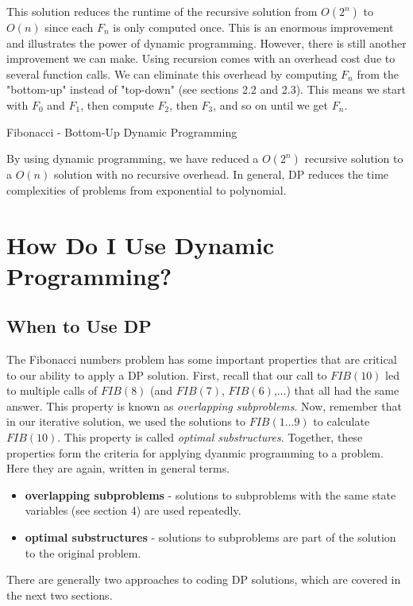 \documentclass{article}
\newcommand{\nl}[]{\newline}
\begin{document}
\noindent This solution reduces the runtime of the recursive solution from $O(2^n)$ to $O(n)$ since each $F_n$ is only computed once. This is an enormous improvement and illustrates the power of dynamic programming. However, there is still another improvement we can make. Using recursion comes with an overhead cost due to several function calls. We can eliminate this overhead by computing $F_n$ from the "bottom-up" instead of "top-down" (see sections 2.2 and 2.3). This means we start with $F_0$ and $F_1$, then compute $F_2$, then $F_3$, and so on until we get $F_n$.
\begin{algorithm}[H]
\caption{Fibonacci - Bottom-Up Dynamic Programming}
\begin{algorithmic}
    \EndFor
\EndFunction
\end{algorithmic}
\end{algorithm}
\noindent By using dynamic programming, we have reduced a $O(2^n)$ recursive solution to a $O(n)$ solution with no recursive overhead. In general, DP reduces the time complexities of problems from exponential to polynomial.
\section{How Do I Use Dynamic Programming?}
\subsection{When to Use DP}
The Fibonacci numbers problem has some important properties that are critical to our ability to apply a DP solution. First, recall that our call to $FIB(10)$ led to multiple calls of $FIB(8)$ (and $FIB(7)$, $FIB(6)$,$\ldots$) that all had the same answer. This property is known as \emph{overlapping subproblems}.\nl\nl
Now, remember that in our iterative solution, we used the solutions to $FIB(1\ldots 9)$ to calculate $FIB(10)$. This property is called \emph{optimal substructures}.\nl\nl
Together, these properties form the criteria for applying dyanmic programming to a problem. Here they are again, written in general terms.
\begin{itemize}
    \item \textbf{overlapping subproblems} - solutions to subproblems with the same state variables (see section 4) are used repeatedly.
    \item \textbf{optimal substructures} - solutions to subproblems are part of the solution to the original problem.
\end{itemize}
There are generally two approaches to coding DP solutions, which are covered in the next two sections.
\end{document}
